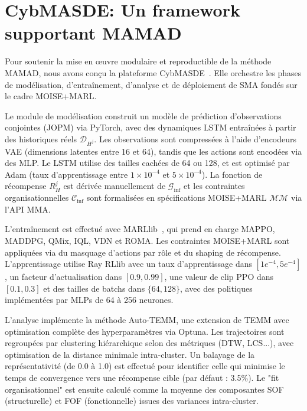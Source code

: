 \chapter{CybMASDE: Un framework supportant MAMAD}
\label{sec:cybmasde}

Pour soutenir la mise en œuvre modulaire et reproductible de la méthode \ac{MAMAD}, nous avons conçu la plateforme \ac{CybMASDE}~\footnotemark[1]. Elle orchestre les phases de modélisation, d'entraînement, d'analyse et de déploiement de \ac{SMA} fondés sur le cadre MOISE+MARL.


Le module de modélisation construit un modèle de prédiction d'observations conjointes (\ac{JOPM}) via PyTorch, avec des dynamiques \ac{LSTM} entraînées à partir des historiques réels $\mathcal{D}_{H^j}$. Les observations sont compressées à l'aide d'encodeurs \ac{VAE} (dimensions latentes entre 16 et 64), tandis que les actions sont encodées via des \ac{MLP}. Le \ac{LSTM} utilise des tailles cachées de 64 ou 128, et est optimisé par Adam (taux d'apprentissage entre $1 \times 10^{-4}$ et $5 \times 10^{-4}$). La fonction de récompense $R^j_H$ est dérivée manuellement de $\mathcal{G}_{\text{inf}}$ et les contraintes organisationnelles $\mathcal{C}_{\text{inf}}$ sont formalisées en spécifications MOISE+MARL $\mathcal{MM}$ via l'API \ac{MMA}.

L'entraînement est effectué avec MARLlib~\cite{hu2022marllib}, qui prend en charge \ac{MAPPO}, \ac{MADDPG}, \ac{QMix}, \ac{IQL}, \ac{VDN} et \ac{ROMA}. Les contraintes MOISE+MARL sont appliquées via du masquage d'actions par rôle et du shaping de récompense. L'apprentissage utilise Ray RLlib avec un taux d'apprentissage dans $[1e^{-4}, 5e^{-4}]$, un facteur d'actualisation dans $[0.9, 0.99]$, une valeur de clip \ac{PPO} dans $[0.1, 0.3]$ et des tailles de batchs dans $\{64, 128\}$, avec des politiques implémentées par \ac{MLP}s de 64 à 256 neurones.

L'analyse implémente la méthode Auto-TEMM, une extension de \ac{TEMM} avec optimisation complète des hyperparamètres via Optuna. Les trajectoires sont regroupées par clustering hiérarchique selon des métriques (\ac{DTW}, \ac{LCS}...), avec optimisation de la distance minimale intra-cluster. Un balayage de la représentativité (de 0.0 à 1.0) est effectué pour identifier celle qui minimise le temps de convergence vers une récompense cible (par défaut : 3.5\%). Le "fit organisationnel" est ensuite calculé comme la moyenne des composantes \ac{SOF} (structurelle) et \ac{FOF} (fonctionnelle) issues des variances intra-cluster.

